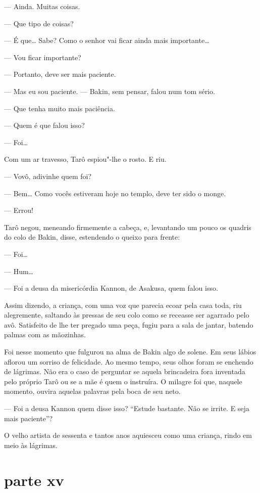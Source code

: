 --- Ainda. Muitas coisas.

--- Que tipo de coisas?

--- É que\ldots{} Sabe? Como o senhor vai ficar ainda mais importante\ldots{}

--- Vou ficar importante?

--- Portanto, deve ser mais paciente.

--- Mas eu sou paciente. --- Bakin, sem pensar, falou num tom sério.

--- Que tenha muito mais paciência.

--- Quem é que falou isso?

--- Foi\ldots{}

Com um ar travesso, Tarô espiou"-lhe o rosto. E riu.

--- Vovô, adivinhe quem foi?

--- Bem\ldots{} Como vocês estiveram hoje no templo, deve ter sido o monge.

--- Errou!

Tarô negou, meneando firmemente a cabeça, e, levantando um pouco os
quadris do colo de Bakin, disse, estendendo o queixo para frente:

--- Foi\ldots{}

--- Hum\ldots{}

--- Foi a deusa da misericórdia Kannon, de Asakusa, quem falou isso.

Assim dizendo, a criança, com uma voz que parecia ecoar pela casa toda,
riu alegremente, saltando às pressas de seu colo como se receasse ser
agarrado pelo avô. Satisfeito de lhe ter pregado uma peça, fugiu para a
sala de jantar, batendo palmas com as mãozinhas.

Foi nesse momento que fulgurou na alma de Bakin algo de solene. Em seus
lábios aflorou um sorriso de felicidade. Ao mesmo tempo, seus olhos
foram se enchendo de lágrimas. Não era o caso de perguntar se aquela
brincadeira fora inventada pelo próprio Tarô ou se a mãe é quem o
instruíra. O milagre foi que, naquele momento, ouvira aquelas palavras
pela boca de seu neto.

--- Foi a deusa Kannon quem disse isso? ``Estude bastante. Não se irrite. E
seja mais paciente''?

O velho artista de sessenta e tantos anos aquiesceu como uma criança,
rindo em meio às lágrimas.

\section*{parte xv}

